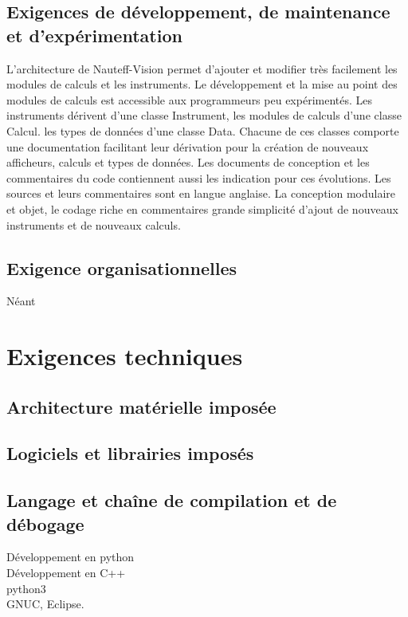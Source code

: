 \documentclass[a4paper,11pt]{report}
\begin{document}
\subsection{Exigences de développement, de maintenance et d'expérimentation}

L'architecture de Nauteff-Vision permet d'ajouter et modifier très facilement
les modules de calculs et les instruments.
Le développement et la mise au point des modules de calculs est accessible aux programmeurs peu expérimentés.
Les instruments dérivent d'une classe Instrument,
les modules de calculs d'une classe Calcul.
les types de données d'une classe Data.
Chacune de ces classes comporte une documentation facilitant leur dérivation
pour la création de nouveaux afficheurs, calculs et types de données.
Les documents de conception et les commentaires du code
contiennent aussi les indication pour ces évolutions.
Les sources et leurs commentaires sont en langue anglaise.
La conception modulaire et objet, le codage riche en commentaires
grande simplicité d'ajout de nouveaux instruments et de nouveaux calculs.

\subsection{Exigence organisationnelles}
Néant

\section{Exigences techniques}
\subsection{Architecture matérielle imposée}
\subsection{Logiciels et librairies imposés}
\subsection{Langage et chaîne de compilation et de débogage}
Développement en python \\
Développement en C++ \\
python3\\
GNUC, Eclipse.\\

\end{document}
